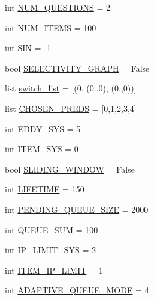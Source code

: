 \begin{DoxyCompactItemize}
\item 
int \hyperlink{namespacedynamicfilterapp_1_1toggles_a6e9b8f89b507e81efe828c45c51e3906}{N\+U\+M\+\_\+\+Q\+U\+E\+S\+T\+I\+O\+NS} = 2
\item 
int \hyperlink{namespacedynamicfilterapp_1_1toggles_a0948720f253a5f2fc7689b2968c8b619}{N\+U\+M\+\_\+\+I\+T\+E\+MS} = 100
\item 
int \hyperlink{namespacedynamicfilterapp_1_1toggles_a46cfe1555e9636aa02be672a0dbfcee8}{S\+IN} = -\/1
\item 
bool \hyperlink{namespacedynamicfilterapp_1_1toggles_a7bfe56554845cde1c15e59ba47f471ed}{S\+E\+L\+E\+C\+T\+I\+V\+I\+T\+Y\+\_\+\+G\+R\+A\+PH} = False
\item 
list \hyperlink{namespacedynamicfilterapp_1_1toggles_abbafede9e00a5523a3cfea9fc4ff4764}{switch\+\_\+list} = \mbox{[}(0, (0.,0), (0.,0))\mbox{]}
\item 
list \hyperlink{namespacedynamicfilterapp_1_1toggles_a1e059d484294d0a2661de21590419600}{C\+H\+O\+S\+E\+N\+\_\+\+P\+R\+E\+DS} = \mbox{[}0,1,2,3,4\mbox{]}
\item 
int \hyperlink{namespacedynamicfilterapp_1_1toggles_a549d2c90f3f5922ad1442df2113fca1b}{E\+D\+D\+Y\+\_\+\+S\+YS} = 5
\item 
int \hyperlink{namespacedynamicfilterapp_1_1toggles_ae8b7db6fd373a0c3225ad361f894aee2}{I\+T\+E\+M\+\_\+\+S\+YS} = 0
\item 
bool \hyperlink{namespacedynamicfilterapp_1_1toggles_adf3c8ab64e62d33397a389d7ba49fe69}{S\+L\+I\+D\+I\+N\+G\+\_\+\+W\+I\+N\+D\+OW} = False
\item 
int \hyperlink{namespacedynamicfilterapp_1_1toggles_a06966aed6fa634825f18ad256f386496}{L\+I\+F\+E\+T\+I\+ME} = 150
\item 
int \hyperlink{namespacedynamicfilterapp_1_1toggles_a642cb0e1f266db761b270ea65af5425a}{P\+E\+N\+D\+I\+N\+G\+\_\+\+Q\+U\+E\+U\+E\+\_\+\+S\+I\+ZE} = 2000
\item 
int \hyperlink{namespacedynamicfilterapp_1_1toggles_a472153a69096a3f18b32cd5ac247f658}{Q\+U\+E\+U\+E\+\_\+\+S\+UM} = 100
\item 
int \hyperlink{namespacedynamicfilterapp_1_1toggles_ab27926159525360b29661a4778b0ce7c}{I\+P\+\_\+\+L\+I\+M\+I\+T\+\_\+\+S\+YS} = 2
\item 
int \hyperlink{namespacedynamicfilterapp_1_1toggles_a755f2e9edbb8b4d5039a950757b9cfb2}{I\+T\+E\+M\+\_\+\+I\+P\+\_\+\+L\+I\+M\+IT} = 1
\item 
int \hyperlink{namespacedynamicfilterapp_1_1toggles_ae5f3a5957b65dd5d074c52ef01e0f732}{A\+D\+A\+P\+T\+I\+V\+E\+\_\+\+Q\+U\+E\+U\+E\+\_\+\+M\+O\+DE} = 4

\end{DoxyCompactItemize}
